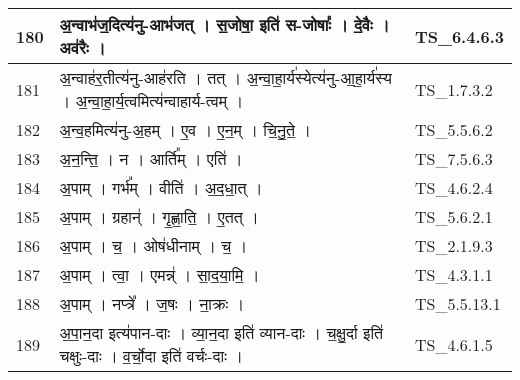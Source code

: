 \documentclass[17pt]{extarticle}
\begin{document}
\begin{longtable}{||p{0.4in}||p{4.9in}||p{0.9in}||}
    \hline
        
    180 & अ॒न्वाभ॑ज॒दित्य॑नु{-}आभ॑जत्   ।   स॒जोषा॒ इति॑ स{-}जोषाः᳚   ।   दे॒वैः   ।   अव॑रैः   ।    & TS\_6.4.6.3       \\
    
    \hline
        
    181 & अ॒न्वाह॑र॒तीत्य॑नु{-}आह॑रति   ।   तत्   ।   अ॒न्वा॒हा॒र्य॑स्येत्य॑नु{-}आ॒हा॒र्य॑स्य   ।   अ॒न्वा॒हा॒र्य॒त्वमित्य॑न्वाहार्य{-}त्वम्   ।    & TS\_1.7.3.2       \\
    
    \hline
        
    182 & अ॒न्व॒हमित्य॑नु{-}अ॒हम्   ।   ए॒व   ।   ए॒न॒म्   ।   चि॒नु॒ते॒   ।    & TS\_5.5.6.2       \\
    
    \hline
        
    183 & अ॒न॒न्ति॒   ।   न   ।   आर्ति᳚म्   ।   एति॑   ।    & TS\_7.5.6.3       \\
    
    \hline
        
    184 & अ॒पाम्   ।   गर्भ᳚म्   ।   वीति॑   ।   अ॒द॒धा॒त्   ।    & TS\_4.6.2.4       \\
    
    \hline
        
    185 & अ॒पाम्   ।   ग्रहान्॑   ।   गृ॒ह्णा॒ति॒   ।   ए॒तत्   ।    & TS\_5.6.2.1       \\
    
    \hline
        
    186 & अ॒पाम्   ।   च॒   ।   ओष॑धीनाम्   ।   च॒   ।    & TS\_2.1.9.3       \\
    
    \hline
        
    187 & अ॒पाम्   ।   त्वा॒   ।   एमन्न्॑   ।   सा॒द॒या॒मि॒   ।    & TS\_4.3.1.1       \\
    
    \hline
        
    188 & अ॒पाम्   ।   नप्त्रे᳚   ।   ज॒षः   ।   ना॒क्रः   ।    & TS\_5.5.13.1       \\
    
    \hline
        
    189 & अ॒पा॒न॒दा इत्य॑पान{-}दाः   ।   व्या॒न॒दा इति॑ व्यान{-}दाः   ।   च॒क्षु॒र्दा इति॑ चक्षुः{-}दाः   ।   व॒र्चो॒दा इति॑ वर्चः{-}दाः   ।    & TS\_4.6.1.5       \\
    
    \hline
        

\end{longtable}
\end{document}
